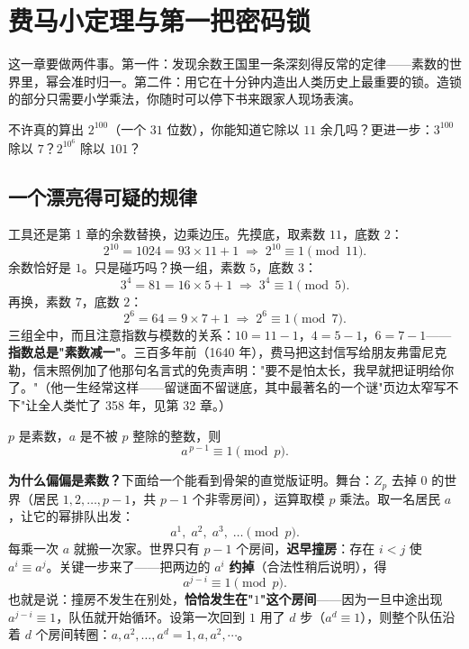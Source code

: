 \chapter{费马小定理与第一把密码锁}

这一章要做两件事。第一件：发现余数王国里一条深刻得反常的定律——素数的世界里，幂会准时归一。第二件：用它在十分钟内造出人类历史上最重要的锁。造锁的部分只需要小学乘法，你随时可以停下书来跟家人现场表演。

\begin{kaiwei}
不许真的算出 $2^{100}$（一个 $31$ 位数），你能知道它除以 $11$ 余几吗？更进一步：$3^{100}$ 除以 $7$？$2^{10^{6}}$ 除以 $101$？
\end{kaiwei}

\section{一个漂亮得可疑的规律}

工具还是第 1 章的余数替换，边乘边压。先摸底，取素数 $11$，底数 $2$：
\[
2^{10} = 1024 = 93\times 11 + 1 \;\Longrightarrow\; 2^{10} \equiv 1 \pmod{11}.
\]
余数恰好是 $1$。只是碰巧吗？换一组，素数 $5$，底数 $3$：
\[
3^4 = 81 = 16\times5 + 1 \;\Longrightarrow\; 3^4 \equiv 1 \pmod 5 .
\]
再换，素数 $7$，底数 $2$：
\[
2^{6} = 64 = 9\times7 + 1 \;\Longrightarrow\; 2^{6} \equiv 1 \pmod 7 .
\]
三组全中，而且注意指数与模数的关系：$10 = 11 - 1$，$4 = 5-1$，$6 = 7-1$——\textbf{指数总是"素数减一"}。三百多年前（1640 年），费马把这封信写给朋友弗雷尼克勒，信末照例加了他那句名言式的免责声明："要不是怕太长，我早就把证明给你了。"（他一生经常这样——留谜面不留谜底，其中最著名的一个谜"页边太窄写不下"让全人类忙了 358 年，见第 32 章。）

\begin{dingli}[费马小定理]
$p$ 是素数，$a$ 是不被 $p$ 整除的整数，则
\[
a^{\,p-1} \equiv 1 \pmod{p}.
\]
\end{dingli}

\textbf{为什么偏偏是素数？}下面给一个能看到骨架的直觉版证明。舞台：$Z_p$ 去掉 $0$ 的世界（居民 $1, 2, \dots, p-1$，共 $p-1$ 个非零房间），运算取模 $p$ 乘法。取一名居民 $a$，让它的幂排队出发：
\[
a^1,\; a^2,\; a^3,\; \dots \pmod p .
\]
每乘一次 $a$ 就搬一次家。世界只有 $p-1$ 个房间，\textbf{迟早撞房}：存在 $i < j$ 使 $a^i \equiv a^j$。关键一步来了——把两边的 $a^i$ \textbf{约掉}（合法性稍后说明），得
\[
a^{j-i} \equiv 1 \pmod p .
\]
也就是说：撞房不发生在别处，\textbf{恰恰发生在"$1$"这个房间}——因为一旦中途出现 $a^{j-i} \equiv 1$，队伍就开始循环。设第一次回到 $1$ 用了 $d$ 步（$a^d \equiv 1$），则整个队伍沿着 $d$ 个房间转圈：$a, a^2, \dots, a^d = 1, a, a^2, \cdots$。

